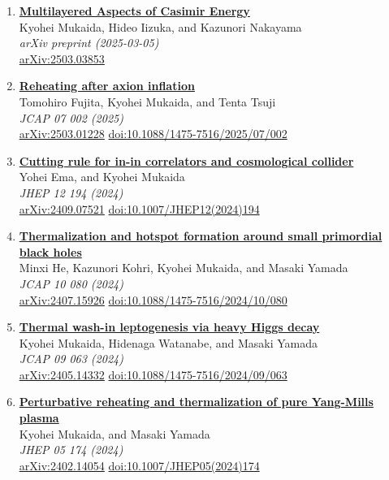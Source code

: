 \begin{enumerate}
\item \textbf{\href{https://arxiv.org/abs/2503.03853}{Multilayered Aspects of Casimir Energy}}\\
Kyohei Mukaida, Hideo Iizuka, and Kazunori Nakayama\\
\emph{arXiv preprint (2025-03-05)}
\\ \href{https://arxiv.org/abs/2503.03853}{arXiv:2503.03853}

\item \textbf{\href{https://arxiv.org/abs/2503.01228}{Reheating after axion inflation}}\\
Tomohiro Fujita, Kyohei Mukaida, and Tenta Tsuji\\
\emph{JCAP 07 002 (2025)}
\\ \href{https://arxiv.org/abs/2503.01228}{arXiv:2503.01228} \href{https://doi.org/10.1088/1475-7516/2025/07/002}{doi:10.1088/1475-7516/2025/07/002}

\item \textbf{\href{https://arxiv.org/abs/2409.07521}{Cutting rule for in-in correlators and cosmological collider}}\\
Yohei Ema, and Kyohei Mukaida\\
\emph{JHEP 12 194 (2024)}
\\ \href{https://arxiv.org/abs/2409.07521}{arXiv:2409.07521} \href{https://doi.org/10.1007/JHEP12(2024)194}{doi:10.1007/JHEP12(2024)194}

\item \textbf{\href{https://arxiv.org/abs/2407.15926}{Thermalization and hotspot formation around small primordial black holes}}\\
Minxi He, Kazunori Kohri, Kyohei Mukaida, and Masaki Yamada\\
\emph{JCAP 10 080 (2024)}
\\ \href{https://arxiv.org/abs/2407.15926}{arXiv:2407.15926} \href{https://doi.org/10.1088/1475-7516/2024/10/080}{doi:10.1088/1475-7516/2024/10/080}

\item \textbf{\href{https://arxiv.org/abs/2405.14332}{Thermal wash-in leptogenesis via heavy Higgs decay}}\\
Kyohei Mukaida, Hidenaga Watanabe, and Masaki Yamada\\
\emph{JCAP 09 063 (2024)}
\\ \href{https://arxiv.org/abs/2405.14332}{arXiv:2405.14332} \href{https://doi.org/10.1088/1475-7516/2024/09/063}{doi:10.1088/1475-7516/2024/09/063}

\item \textbf{\href{https://arxiv.org/abs/2402.14054}{Perturbative reheating and thermalization of pure Yang-Mills plasma}}\\
Kyohei Mukaida, and Masaki Yamada\\
\emph{JHEP 05 174 (2024)}
\\ \href{https://arxiv.org/abs/2402.14054}{arXiv:2402.14054} \href{https://doi.org/10.1007/JHEP05(2024)174}{doi:10.1007/JHEP05(2024)174}


\end{enumerate}
